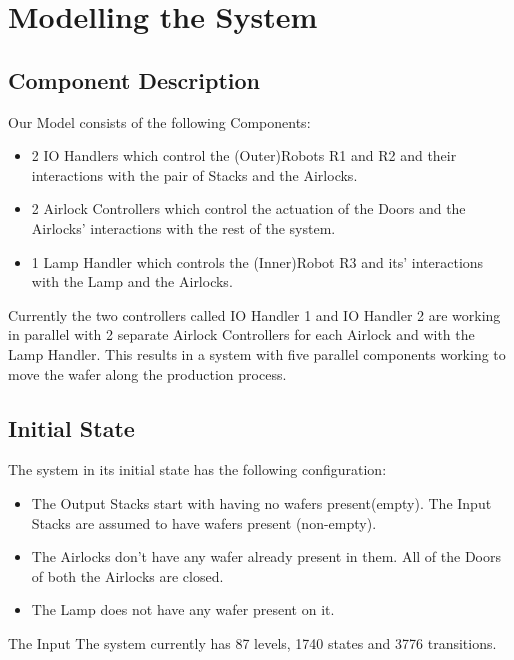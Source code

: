 \documentclass[a4paper,12pt]{article}
\begin{document}
\newpage
\section{Modelling the System}
\subsection{Component Description}
Our Model consists of the following Components:
\begin{itemize}
    \item 2 IO Handlers which control the (Outer)Robots R1 and R2 and their interactions with the pair of Stacks and the Airlocks.
    \item 2 Airlock Controllers which control the actuation of the Doors and the Airlocks' interactions with the rest of the system.
    \item 1 Lamp Handler which controls the (Inner)Robot R3 and its' interactions with the Lamp and the Airlocks.
\end{itemize}
Currently the two controllers called IO Handler 1 and IO Handler 2 are working in parallel with 2 separate Airlock Controllers for each Airlock and with the Lamp Handler. This results in a system with five parallel components working to move the wafer along the production process. 
\subsection{Initial State}
The system in its initial state has the following configuration:
\begin{itemize}
    \item The Output Stacks start with having no wafers present(empty). The Input Stacks are assumed to have wafers present (non-empty).
    \item The Airlocks don't have any wafer already present in them. All of the Doors of both the Airlocks are closed.
    \item The Lamp does not have any wafer present on it.
\end{itemize} 
The Input The system currently has 87 levels, 1740 states and 3776 transitions.
\end{document}

